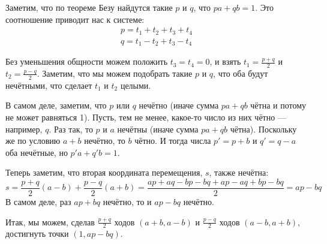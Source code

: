 \begin{enumerate}
Заметим, что по теореме Безу найдутся такие $p$ и $q$, что $pa + qb = 1$.
Это соотношение приводит нас к системе:
$$\begin{array}{l}
p = t_1 + t_2 + t_3 + t_4\\
q = t_1 - t_2 + t_3 - t_4
\end{array}$$

Без уменьшения общности можем положить $t_3 = t_4 = 0$, и взять
$t_1 = \frac{p+q}{2}$ и $t_2 = \frac{p-q}{2}$.
Заметим, что мы можем подобрать такие $p$ и $q$, что оба будут нечётными,
что сделает $t_1$ и $t_2$ целыми.

В самом деле, заметим, что $p$ или $q$ нечётно
(иначе сумма $pa + qb$ чётна и потому не может равняться 1).
Пусть, тем не менее, какое-то число из них чётно --- например, $q$. 
Раз так, то $p$ и $a$ нечётны (иначе сумма $pa+qb$ чётна). 
Поскольку же по условию $a+b$ нечётно, то $b$ чётно. 
И тогда числа $p'=p+b$ и $q'=q-a$ оба нечётные,
но $p'a + q'b = 1$.

Теперь заметим, что вторая координата перемещения, $s$, также нечётна:
$$s = \frac{p+q}{2} (a-b) + \frac{p-q}{2} (a+b) = \frac{ap+aq-bp-bq+ap-aq+bp-bq}{2} = ap-bq$$
В самом деле, раз $ap+bq$ нечётно, то и $ap-bq$ нечётно.

Итак, мы можем, сделав $\frac{p+q}{2}$ ходов $(a+b,a-b)$ и
$\frac{p-q}{2}$ ходов $(a-b,a+b)$, достигнуть точки $(1,ap-bq)$.



\end{enumerate}